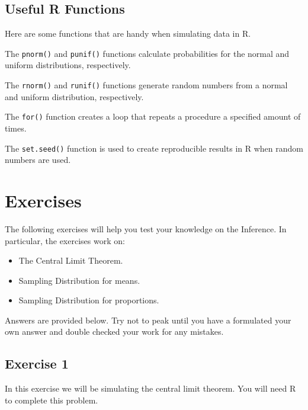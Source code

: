 \documentclass[
  letterpaper,
  DIV=11,
  numbers=noendperiod]{scrreprt}
\begin{document}
\hypertarget{useful-r-functions-10}{%
\subsection*{Useful R Functions}\label{useful-r-functions-10}}

Here are some functions that are handy when simulating data in R.

The \texttt{pnorm()} and \texttt{punif()} functions calculate
probabilities for the normal and uniform distributions, respectively.

The \texttt{rnorm()} and \texttt{runif()} functions generate random
numbers from a normal and uniform distribution, respectively.

The \texttt{for()} function creates a loop that repeats a procedure a
specified amount of times.

The \texttt{set.seed()} function is used to create reproducible results
in R when random numbers are used.

\hypertarget{exercises-10}{%
\section{Exercises}\label{exercises-10}}

The following exercises will help you test your knowledge on the
Inference. In particular, the exercises work on:

\begin{itemize}
\item
  The Central Limit Theorem.
\item
  Sampling Distribution for means.
\item
  Sampling Distribution for proportions.
\end{itemize}

Answers are provided below. Try not to peak until you have a formulated
your own answer and double checked your work for any mistakes.

\hypertarget{exercise-1-20}{%
\subsection*{Exercise 1}\label{exercise-1-20}}

In this exercise we will be simulating the central limit theorem. You
will need R to complete this problem.
\end{document}
